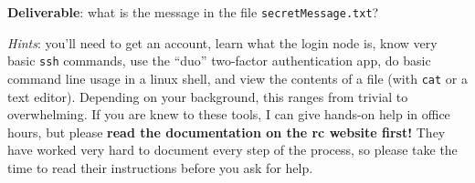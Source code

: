 \documentclass[10pt, letterpaper]{scrartcl}
\begin{document}
\begin{enumerate}[align=left, leftmargin=*, label=\bfseries Problem \arabic*:]
    \textbf{Deliverable}: what is the message in the file \texttt{secretMessage.txt}?
    
     \emph{Hints}: you'll need to get an account, learn what the login node is, know very basic \texttt{ssh} commands, use the ``duo'' two-factor authentication app, do basic command line usage in a linux shell, and view the contents of a file (with \texttt{cat} or a text editor). Depending on your background, this ranges from trivial to overwhelming. If you are knew to these tools, I can give hands-on help in office hours, but please \textbf{read the documentation on the rc website first!} They have worked very hard to document every step of the process, so please take the time to read their instructions before you ask for help.
    
\end{enumerate}



    
\end{document}
